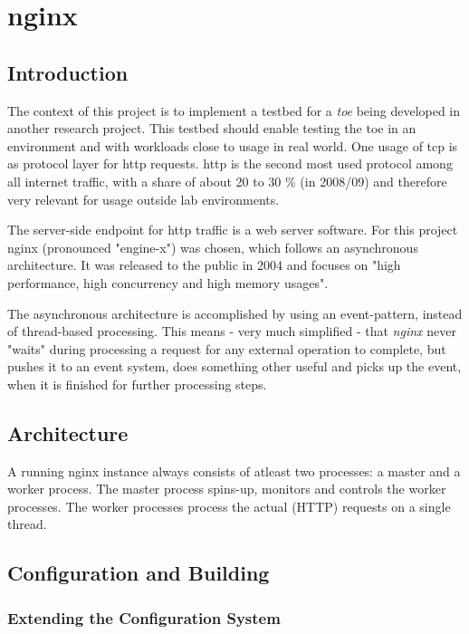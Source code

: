 \chapter{nginx}
\label{ch:nginx}

\section{Introduction}

The context of this project is to implement a testbed for a \textit{\gls{toe}} being developed in another research project. This testbed should enable testing the \gls{toe} in an environment and with workloads close to usage in real world. One usage of \gls{tcp} is as protocol layer for \gls{http} requests. \gls{http} is the second most used protocol among all internet traffic, with a share of about 20 to 30 \% (in 2008/09) \cite{internet_study} and therefore very relevant for usage outside lab environments. 

The server-side endpoint for \gls{http} traffic is a web server software. For this project nginx (pronounced "engine-x") was chosen, which follows an asynchronous architecture. It was released to the public in 2004 and focuses on "high performance, high concurrency and high memory usages"\cite{aosa}.

The asynchronous architecture is accomplished by using an event-pattern, instead of thread-based processing. This means - very much simplified - that \textit{nginx} never "waits" during processing a request for any external operation to complete, but pushes it to an event system, does something other useful and picks up the event, when it is finished for further processing steps.

\section{Architecture}
\label{sec:nginx-arch}

A running nginx instance always consists of atleast two processes: a master and a worker process. The master process spins-up, monitors and controls the worker processes. The worker processes process the actual (HTTP) requests on a single thread.

\section{Configuration and Building}

\subsection{Extending the Configuration System}


